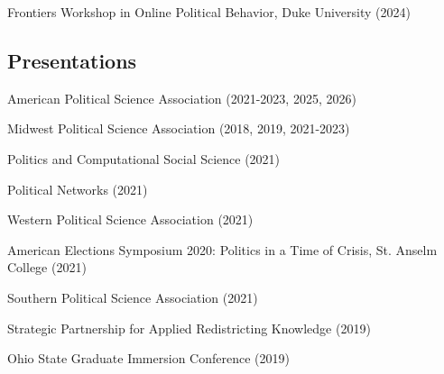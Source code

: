 \documentclass[letterpaper]{article}
\renewenvironment{itemize}{
  \begin{list}{}{
    \setlength{\leftmargin}{1.5em}
  }
}{
  \end{list}
}
\begin{document}
\begin{itemize}
\item Frontiers Workshop in Online Political Behavior, Duke University (2024) 
\end{itemize}

\subsection*{Presentations}
\begin{itemize}

\item American Political Science Association (2021-2023, 2025, 2026)

\item Midwest Political Science Association (2018, 2019, 2021-2023)

\item Politics and Computational Social Science (2021)

\item Political Networks (2021)

\item Western Political Science Association (2021)

\item American Elections Symposium 2020: Politics in a Time of Crisis, St. Anselm College (2021)

\item Southern Political Science Association (2021)

\item Strategic Partnership for Applied Redistricting Knowledge (2019)

\item Ohio State Graduate Immersion Conference (2019)
\end{itemize}
\end{document}
